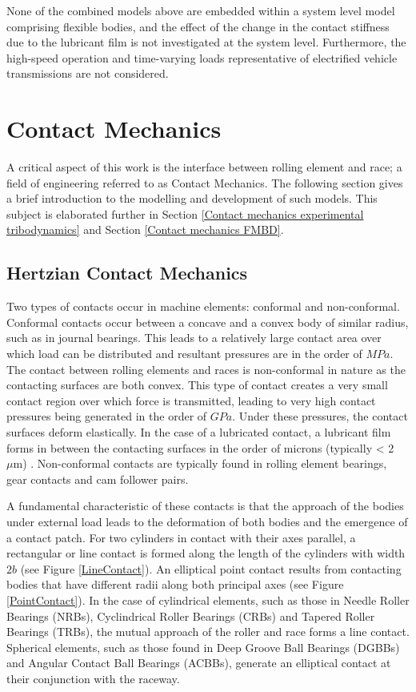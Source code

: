 None of the combined models above are embedded within a system level model comprising flexible bodies, and the effect of the change in the contact stiffness due to the lubricant film is not investigated at the system level. Furthermore, the high-speed operation and time-varying loads representative of electrified vehicle transmissions are not considered.

\section{Contact Mechanics}
A critical aspect of this work is the interface between rolling element and race; a field of engineering referred to as Contact Mechanics. The following section gives a brief introduction to the modelling and development of such models. This subject is elaborated further in Section \ref{Contact mechanics experimental tribodynamics} and Section \ref{Contact mechanics FMBD}.

\subsection{Hertzian Contact Mechanics}

Two types of contacts occur in machine elements: conformal and non-conformal. Conformal contacts occur between a concave and a convex body of similar radius, such as in journal bearings. This leads to a relatively large contact area over which load can be distributed and resultant pressures are in the order of $MPa$. The contact between rolling elements and races is non-conformal in nature as the contacting surfaces are both convex. This type of contact creates a very small contact region over which force is transmitted, leading to very high contact pressures being generated in the order of $GPa$. Under these pressures, the contact surfaces deform elastically. In the case of a lubricated contact, a lubricant film forms in between the contacting surfaces in the order of microns (typically < 2~$\mu \mathrm{m}$) \cite{Gohar2018}. Non-conformal contacts are typically found in rolling element bearings, gear contacts and cam follower pairs.

A fundamental characteristic of these contacts is that the approach of the bodies under external load leads to the deformation of both bodies and the emergence of a contact patch. For two cylinders in contact with their axes parallel, a rectangular or line contact is formed along the length of the cylinders with width $2b$ (see Figure \ref{LineContact}). An elliptical point contact results from contacting bodies that have different radii along both principal axes \cite{Johnson1985} (see Figure \ref{PointContact}). In the case of cylindrical elements, such as those in Needle Roller Bearings (NRBs), Cyclindrical Roller Bearings (CRBs) and Tapered Roller Bearings (TRBs), the mutual approach of the roller and race forms a line contact. Spherical elements, such as those found in Deep Groove Ball Bearings (DGBBs) and Angular Contact Ball Bearings (ACBBs), generate an elliptical contact at their conjunction with the raceway.

